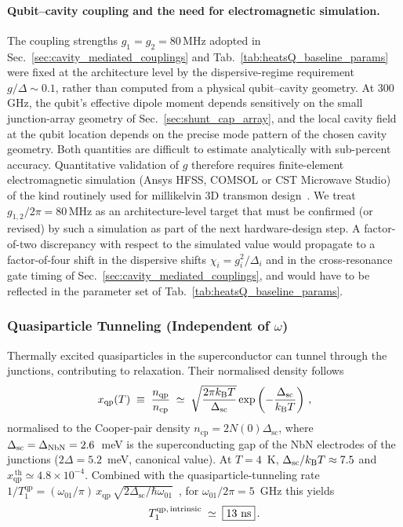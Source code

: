 \paragraph{Qubit--cavity coupling and the need for electromagnetic simulation.}\label{sec:em_simulation}
The coupling strengths $g_1=g_2=80\,\text{MHz}$ adopted in
Sec.~\ref{sec:cavity_mediated_couplings} and
Tab.~\ref{tab:heatsQ_baseline_params} were fixed at the architecture level by
the dispersive-regime requirement $g/\Delta \sim 0.1$, rather than computed
from a physical qubit--cavity geometry. At 300\,GHz, the qubit's effective
dipole moment depends sensitively on the small junction-array geometry of
Sec.~\ref{sec:shunt_cap_array}, and the local cavity field at the qubit
location depends on the precise mode pattern of the chosen cavity geometry.
Both quantities are difficult to estimate analytically with sub-percent accuracy.
Quantitative validation of $g$ therefore requires finite-element electromagnetic
simulation (Ansys HFSS, COMSOL or CST Microwave Studio) of the kind routinely
used for millikelvin 3D transmon design~\cite{Wang2015,blais2021circuit}.
We treat $g_{1,2}/2\pi=80\,\text{MHz}$ as an architecture-level target that
must be confirmed (or revised) by such a simulation as part of the next
hardware-design step. A factor-of-two discrepancy with respect to the simulated
value would propagate to a factor-of-four shift in the dispersive shifts
$\chi_i = g_i^{2}/\Delta_i$ and in the cross-resonance gate timing of
Sec.~\ref{sec:cavity_mediated_couplings}, and would have to be reflected in
the parameter set of Tab.~\ref{tab:heatsQ_baseline_params}.

\subsubsection{Quasiparticle Tunneling (Independent of $\omega$)}

Thermally excited quasiparticles in the superconductor can tunnel
through the junctions, contributing to relaxation. Their normalised
density follows~\cite{Catelani2011QP}
\begin{equation}
x_{\text{qp}}(T) \;\equiv\; \frac{n_{\text{qp}}}{n_{\text{cp}}}
   \;\simeq\; \sqrt{\frac{2\pi k_{\mathrm{B}} T}{\Delta_{\text{sc}}}}
     \exp\left(-\frac{\Delta_{\text{sc}}}{k_{\mathrm{B}} T}\right) \,,
\label{eq:nqp}
\end{equation}
normalised to the Cooper-pair density $n_{\text{cp}} = 2 N(0)
\Delta_{\text{sc}}$, where $\Delta_{\text{sc}} = \Delta_{\rm NbN} =
2.6$~meV is the superconducting gap of the NbN electrodes of the
junctions ($2\Delta = 5.2$~meV, canonical value). At $T = 4$~K,
$\Delta_{\text{sc}}/k_{\mathrm{B}} T \approx 7.5$ and
$x_{\text{qp}}^{\,\text{th}} \simeq 4.8\times 10^{-4}$.
Combined with the quasiparticle-tunneling rate
$1/T_1^{\text{qp}} = (\omega_{01}/\pi)\,x_{\text{qp}}\,
\sqrt{2\Delta_{\text{sc}}/\hbar\omega_{01}}$~\cite{Catelani2011QP},
for $\omega_{01}/2\pi = 5$~GHz this yields
\begin{equation}
T_1^{\text{qp,\,intrinsic}} \;\simeq\; \boxed{13~\text{ns}} \,.
\end{equation}

